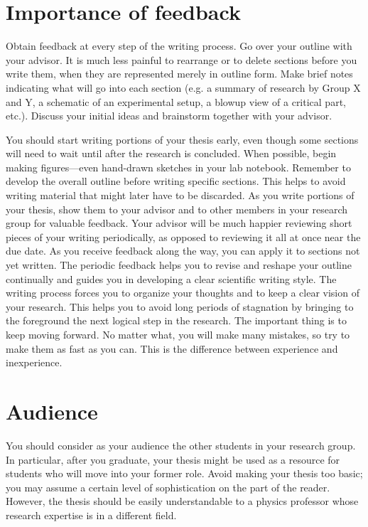 \section{Importance of feedback}
\label{sec:Feedback}

Obtain feedback at every step of the writing process. Go over your
outline with your advisor. It is much less painful to rearrange or
to delete sections before you write them, when they are represented
merely in outline form. Make brief notes indicating what will go
into each section (e.g. a summary of research by Group X and Y, a
schematic of an experimental setup, a blowup view of a critical
part, etc.). Discuss your initial ideas and brainstorm together with
your advisor.

You should start writing portions of your thesis early, even though
some sections will need to wait until after the research is
concluded. When possible, begin making figures---even hand-drawn
sketches in your lab notebook. Remember to develop the overall
outline before writing specific sections. This helps to avoid
writing material that might later have to be discarded. As you write
portions of your thesis, show them to your advisor and to other
members in your research group for valuable feedback. Your advisor
will be much happier reviewing short pieces of your writing
periodically, as opposed to reviewing it all at once near the due
date. As you receive feedback along the way, you can apply it to
sections not yet written. The periodic feedback helps you to revise
and reshape your outline continually and guides you in developing a
clear scientific writing style. The writing process forces you to
organize your thoughts and to keep a clear vision of your research.
This helps you to avoid long periods of stagnation by bringing to
the foreground the next logical step in the research. The important
thing is to keep moving forward. No matter what, you will make many
mistakes, so try to make them as fast as you can. This is the
difference between experience and inexperience.

\section{Audience}
\label{sec:Audience}

You should consider as your audience the other students in your
research group. In particular, after you graduate, your thesis might
be used as a resource for students who will move into your former
role. Avoid making your thesis too basic; you may assume a certain
level of sophistication on the part of the reader. However, the
thesis should be easily understandable to a physics professor whose
research expertise is in a different field.

